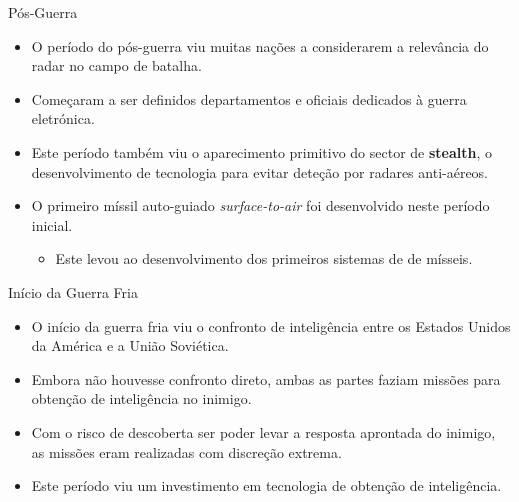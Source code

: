 \documentclass[portuguese,10pt]{beamer}
\begin{document}
\begin{frame}{Pós-Guerra}
    \begin{itemize}
        \item<1-> O período do pós-guerra viu muitas nações a considerarem a relevância do radar no campo de batalha.
        \item<2-> Começaram a ser definidos departamentos e oficiais dedicados à guerra eletrónica.
        \item<3-> Este período também viu o aparecimento primitivo do sector de \textbf{stealth}, o desenvolvimento de tecnologia para evitar deteção por radares anti-aéreos.
        \item<4-> O primeiro míssil auto-guiado \textit{surface-to-air} foi desenvolvido neste período inicial.
        \begin{itemize}
            \item Este levou ao desenvolvimento dos primeiros sistemas de \jamming{} de mísseis.
        \end{itemize}
    \end{itemize}
\end{frame}

\begin{frame}{Início da Guerra Fria}
    \begin{itemize}
        \item O início da guerra fria viu o confronto de inteligência entre os Estados Unidos da América e a União Soviética.
        \item Embora não houvesse confronto direto, ambas as partes faziam missões para obtenção de inteligência no inimigo.
        \item Com o risco de descoberta ser poder levar a resposta aprontada do inimigo, as missões eram realizadas com discreção extrema.
        \item Este período viu um investimento em tecnologia de obtenção de inteligência.
    \end{itemize}
\end{frame}
\end{document}
